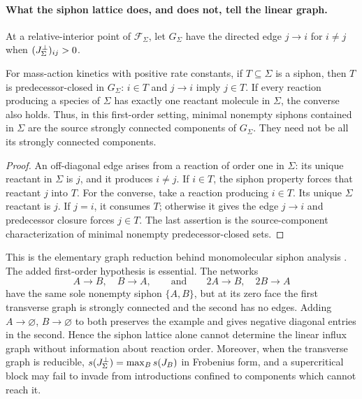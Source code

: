 \paragraph{What the siphon lattice does, and does not, tell the linear graph.}
At a relative-interior point of $\mathcal F_\Sigma$, let $G_\Sigma$ have the
directed edge $j\to i$ for $i\ne j$ when
$(J_{\Sigma}^\perp)_{ij}>0$.

\label{p:toolGraph}\label{t:Sip}
For mass-action kinetics with positive rate constants, if
$T\subseteq\Sigma$ is a siphon, then $T$ is predecessor-closed in
$G_\Sigma$: $i\in T$ and $j\to i$ imply $j\in T$.
If every reaction producing a species of $\Sigma$ has exactly one
reactant molecule in $\Sigma$, the converse also holds.
Thus, in this first-order setting, minimal nonempty siphons contained
in $\Sigma$ are the source strongly connected components of
$G_\Sigma$. They need not be all its strongly connected components.
\eeT
\begin{proof}
An off-diagonal edge arises from a reaction of order one in $\Sigma$:
its unique reactant in $\Sigma$ is $j$, and it produces $i\ne j$.
If $i\in T$, the siphon property forces that reactant $j$ into $T$.
For the converse, take a reaction producing $i\in T$. Its unique
$\Sigma$ reactant is $j$. If $j=i$, it consumes $T$; otherwise it
gives the edge $j\to i$ and predecessor closure forces $j\in T$.
The last assertion is the source-component characterization of
minimal nonempty predecessor-closed sets.
\end{proof}
This is the elementary graph reduction behind monomolecular siphon
analysis \cite{AdLS,ShiuStu,Berman}. \label{pg:2A2B}The added first-order hypothesis is
essential. The networks
\[
 A\to B,\quad B\to A,
 \qquad\text{and}\qquad
 2A\to B,\quad 2B\to A
\]
have the same sole nonempty siphon $\{A,B\}$, but at its zero face the
first transverse graph is strongly connected and the second has no
edges. Adding $A\to\varnothing$, $B\to\varnothing$ to both preserves
the example and gives negative diagonal entries in the second.
Hence the siphon lattice alone cannot determine the linear influx
graph without information about reaction order. Moreover, when the
transverse graph is reducible,
$s(J_{\Sigma}^\perp)=\max_B s(J_B)$ in Frobenius form, and a
supercritical block may fail to invade from introductions confined
to components which cannot reach it.

\ifshort\else
